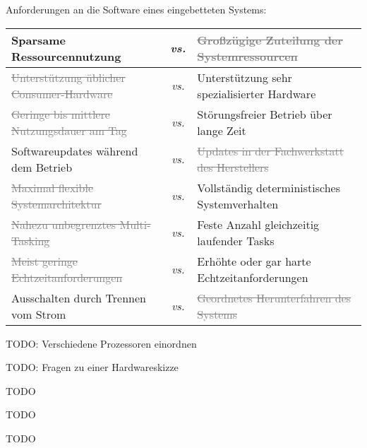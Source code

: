 \bigskip
\teilaufgabe
Anforderungen an die Software eines eingebetteten Systems:

\begin{longtable}{|p{} c p{}|}
    \hline
    Sparsame Ressourcennutzung
    & \textit{vs.} &
    \textcolor{gray}{\sout{Großzügige Zuteilung der Systemressourcen}}
    \\

    \hline
    \textcolor{gray}{\sout{Unterstützung üblicher Consumer-Hardware}}
    & \textit{vs.} &
    Unterstützung sehr spezialisierter Hardware
    \\

    \hline
    \textcolor{gray}{\sout{Geringe bis mittlere Nutzungsdauer am Tag}}
    & \textit{vs.} &
    Störungsfreier Betrieb über lange Zeit
    \\

    \hline
    Softwareupdates während dem Betrieb
    & \textit{vs.} &
    \textcolor{gray}{\sout{Updates in der Fachwerkstatt des Herstellers}}
    \\

    \hline
    \textcolor{gray}{\sout{Maximal flexible Systemarchitektur}}
    & \textit{vs.} &
    Vollständig deterministisches Systemverhalten
    \\

    \hline
    \textcolor{gray}{\sout{Nahezu unbegrenztes Multi-Tasking}}
    & \textit{vs.} &
    Feste Anzahl gleichzeitig laufender Tasks
    \\

    \hline
    \textcolor{gray}{\sout{Meist geringe Echtzeitanforderungen}}
    & \textit{vs.} &
    Erhöhte oder gar harte Echtzeitanforderungen
    \\

    \hline
    Ausschalten durch Trennen vom Strom
    & \textit{vs.} &
    \textcolor{gray}{\sout{Geordnetes Herunterfahren des Systems}}
    \\

    \hline
\end{longtable}

\teilaufgabe
TODO: Verschiedene Prozessoren einordnen

\teilaufgabe
TODO: Fragen zu einer Hardwareskizze

TODO

TODO

TODO
